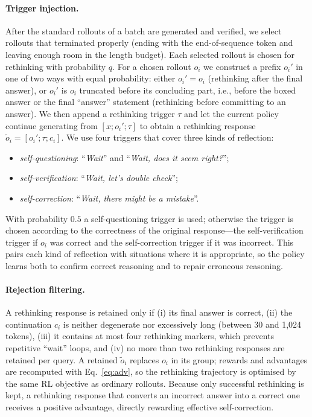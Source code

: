 \documentclass{article}
\begin{document}
\paragraph{Trigger injection.} After the standard rollouts of a batch are generated and verified, we select rollouts that terminated properly (ending with the end-of-sequence token and leaving enough room in the length budget). Each selected rollout is chosen for rethinking with probability $q$. For a chosen rollout $o_i$ we construct a prefix $o_i'$ in one of two ways with equal probability: either $o_i'=o_i$ (rethinking after the final answer), or $o_i'$ is $o_i$ truncated before its concluding part, i.e., before the boxed answer or the final ``answer'' statement (rethinking before committing to an answer). We then append a rethinking trigger $\tau$ and let the current policy continue generating from $[x; o_i'; \tau]$ to obtain a rethinking response $\tilde{o}_i=[o_i';\tau;c_i]$. We use four triggers that cover three kinds of reflection:
\begin{itemize}[leftmargin=*,itemsep=0pt,topsep=2pt]
\item \emph{self-questioning}: ``\emph{Wait}'' and ``\emph{Wait, does it seem right?}'';
\item \emph{self-verification}: ``\emph{Wait, let's double check}'';
\item \emph{self-correction}: ``\emph{Wait, there might be a mistake}''.
\end{itemize}
With probability $0.5$ a self-questioning trigger is used; otherwise the trigger is chosen according to the correctness of the original response---the self-verification trigger if $o_i$ was correct and the self-correction trigger if it was incorrect. This pairs each kind of reflection with situations where it is appropriate, so the policy learns both to confirm correct reasoning and to repair erroneous reasoning.

\paragraph{Rejection filtering.} A rethinking response is retained only if (i) its final answer is correct, (ii) the continuation $c_i$ is neither degenerate nor excessively long (between 30 and 1,024 tokens), (iii) it contains at most four rethinking markers, which prevents repetitive ``wait'' loops, and (iv) no more than two rethinking responses are retained per query. A retained $\tilde{o}_i$ replaces $o_i$ in its group; rewards and advantages are recomputed with Eq.~\eqref{eq:adv}, so the rethinking trajectory is optimised by the same RL objective as ordinary rollouts. Because only successful rethinking is kept, a rethinking response that converts an incorrect answer into a correct one receives a positive advantage, directly rewarding effective self-correction.
\end{document}
